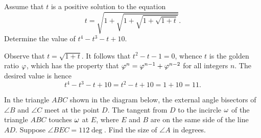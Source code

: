 \clearpage
\begin{question}[11]\label{Q::2022-O-1-14}
    Assume that $t$ is a positive solution to the equation \[t = \sqrt{1 + \sqrt{1 + \sqrt{1 + \sqrt{1 + t}}}}.\] Determine the value of $t^4 - t^3 - t + 10$.
\end{question}
\begin{solution*}
    Observe that $t = \sqrt{1 + t}$. It follows that $t^2 - t - 1 = 0$, whence $t$ is the golden ratio $\varphi$, which has the property that $\varphi^n = \varphi^{n-1} + \varphi^{n-2}$ for all integers $n$. The desired value is hence \[t^4 - t^3 - t + 10 = t^2 - t + 10 = 1 + 10 = 11.\]
\end{solution*}

\begin{question}[44]\label{Q::2022-O-1-15}
    In the triangle $ABC$ shown in the diagram below, the external angle bisectors of $\angle B$ and $\angle C$ meet at the point $D$. The tangent from $D$ to the incircle $\omega$ of the triangle $ABC$ touches $\omega$ at $E$, where $E$ and $B$ are on the same side of the line $AD$. Suppose $\angle BEC = 112\deg$. Find the size of $\angle A$ in degrees.

    \begin{center}
    \end{center}
\end{question}
